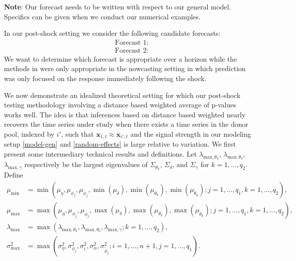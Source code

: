 \documentclass[11pt]{article}
\newcommand{\x}{\textbf{x}}
\theoremstyle{definition}
\begin{document}
\vspace*{0.5cm}

\noindent\textbf{Note}: Our forecast needs to be written with respect to our general model. Specifics can be given when we conduct our numerical examples.
\vspace*{0.5cm}

In our post-shock setting we consider the following candidate forecasts: 
\begin{align*}
  &\text{Forecast 1}: \\
  &\text{Forecast 2}: 
\end{align*}
We want to determine which forecast is appropriate over a horizon while the methods in \cite{lin2021minimizing} were only appropriate in the nowcasting setting in which prediction was only focused on the response immediately following the shock.





\newpage


\newpage

\vspace*{0.5cm} We now demonstrate an idealized theoretical setting for which our post-shock testing methodology involving a distance based weighted average of p-values works well. The idea is that inferences based on distance based weighted nearly recovers the time series under study when there exists a time series in the donor pool, indexed by $i'$, such that $\x_{1,t} \approx \x_{i',t}$ and the signal strength in our modeling setup \eqref{model-gen} and \eqref{random-effects} is large relative to variation. We first present some intermediary technical results and definitions. Let $\lambda_{\text{max},\theta_k}$, $\lambda_{\text{max},\theta_\delta}$, $\lambda_{\text{max},\gamma}$ respectively be the largest eigenvalues of $\Sigma_{\theta_k}$, $\Sigma_{\delta}$, and $\Sigma_{\gamma}$ for $k = 1,\ldots,q_2$. Define  
\begin{align*}
  \mu_{\min} &= \min\left(\mu_\eta,\mu_{\phi_j},\mu_{\tilde\phi_j},\min(\mu_\delta),\min(\mu_{\theta_k}),\min(\mu_{\tilde\theta_k}); j = 1,\ldots,q_1, k = 1,\ldots,q_2\right), \\
  \mu_{\max} &= \max\left(\mu_\eta,\mu_{\phi_j},\mu_{\tilde\phi_j},\max(\mu_\delta),\max(\mu_{\theta_k}),\max(\mu_{\tilde\theta_k}); j = 1,\ldots,q_1, k = 1,\ldots,q_2\right), \\
  \lambda_{\max} &= \max\left(\lambda_{\text{max},\theta_k}, \lambda_{\text{max},\theta_\delta}, \lambda_{\text{max},\gamma}; k = 1,\ldots,q_2\right), \\
  \sigma^2_{\max} &= \max\left(\sigma^2_{\eta},\sigma^2_{\phi_j},\sigma^2_i,\sigma^2_{\alpha},\sigma^2_{\tilde{\phi}_j}; i = 1,\ldots,n+1, j = 1,\ldots,q_1\right).  
\end{align*}
\end{document}
